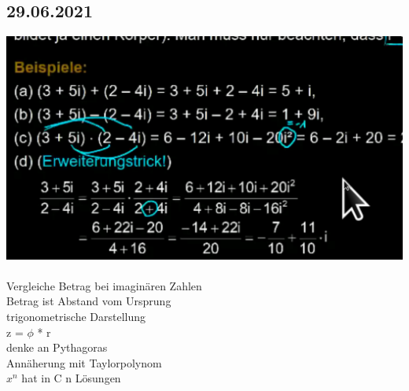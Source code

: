 \documentclass{article}
\begin{document}
	\subsection*{29.06.2021}
	\includegraphics[width=\linewidth]{samplekz} \\ \\
	Vergleiche Betrag bei imaginären Zahlen \\
	Betrag ist Abstand vom Ursprung \\
	trigonometrische Darstellung \\
	z = $\phi$ * r \\
	denke an Pythagoras \\
	Annäherung mit Taylorpolynom \\
	$x^{n}$ hat in C n Lösungen \\
\end{document}
